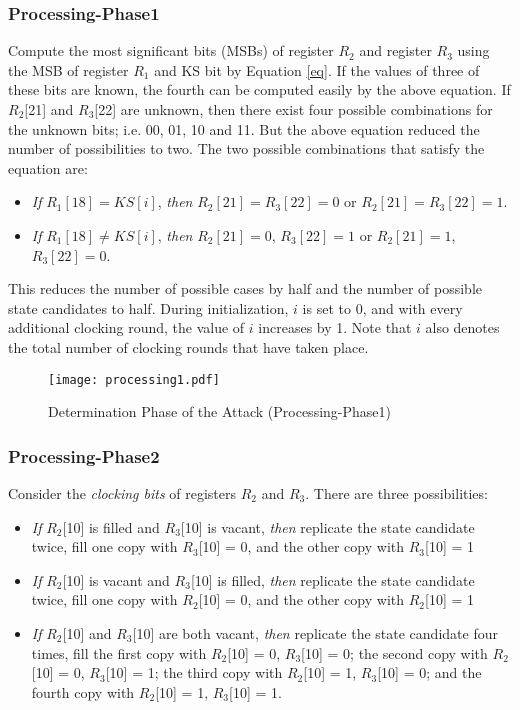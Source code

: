 \documentclass{llncs}
\begin{document}
\subsubsection{Processing-Phase1} Compute the most significant bits (MSBs) of register $R_{2}$ and register $R_{3}$ using the MSB of register $R_{1}$ and KS bit by Equation \ref{eq}.
If the values of three of these bits are known, the fourth can be computed easily by the above equation. If $R_{2}$[21] and $R_{3}$[22] are unknown, then there exist four possible combinations for the unknown bits; i.e. 00, 01, 10 and 11. But the above equation reduced the number of possibilities to two. The two possible combinations that satisfy the equation are: 
\begin{itemize}
\item \emph{If} $R_{1}[18] = KS[i]$, \emph{then} $R_{2}[21] = R_{3}[22] = 0$ or $R_{2}[21] = R_{3}[22] = 1$.
\item \emph{If} $R_{1}[18] \neq KS[i]$, \emph{then} $R_{2}[21] = 0$, $R_{3}[22] = 1$ or $R_{2}[21] = 1$, $R_{3}[22] = 0$.
\end{itemize} 
This reduces the number of possible cases by half and the number of possible state candidates to half. During initialization, $i$ is set to 0, and with every additional clocking round, the value of $i$ increases by 1. Note that $i$ also denotes the total number of clocking rounds that have taken place. 

\begin{figure}[!htb]
\begin{center}
\hspace*{-1cm}
\texttt{[image: processing1.pdf]}
\caption{Determination Phase of the Attack (Processing-Phase1)}
\label{processing1}
\end{center}
\end{figure}

\subsubsection{Processing-Phase2} Consider the \emph{clocking bits} of registers $R_{2}$ and $R_{3}$. There are three possibilities: 
\begin{itemize}
\item \emph{If} $R_{2}$[10] is filled and $R_{3}$[10] is vacant, \emph{then} replicate the state candidate twice, fill one copy with $R_{3}$[10] = 0, and the other copy with $R_{3}$[10] = 1
\item \emph{If} $R_{2}$[10] is vacant and $R_{3}$[10] is filled, \emph{then} replicate the state candidate twice, fill one copy with $R_{2}$[10] = 0, and the other copy with $R_{2}$[10] = 1
\item \emph{If} $R_{2}$[10] and $R_{3}$[10] are both vacant, \emph{then} replicate the state candidate four times, fill the first copy with $R_{2}$[10] = 0, $R_{3}$[10] = 0; the second copy with $R_{2}$[10] = 0, $R_{3}$[10] = 1; the third copy with $R_{2}$[10] = 1, $R_{3}$[10] = 0; and the fourth copy with $R_{2}$[10] = 1, $R_{3}$[10] = 1.
\end{itemize}
\end{document}
